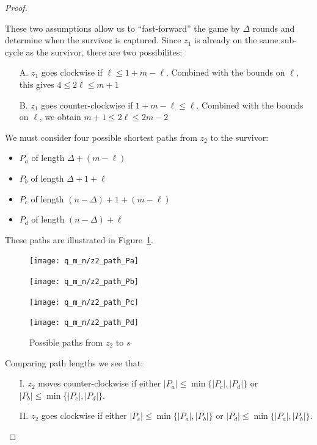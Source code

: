 \begin{proof}
\begin{proofpart}
  These two assumptions allow us to ``fast-forward'' the game by $\Delta$ rounds
  and determine when the survivor is captured. Since $z_1$ is already on the same sub-cycle as the survivor, there are two possibilites:

  \begin{itemize}
   \item[A.] $z_1$ goes clockwise if $\ell \leq 1 + m - \ell$.
         Combined with the bounds on $\ell$, this gives $4 \leq 2 \ell \leq m + 1$

   \item[B.] $z_1$ goes counter-clockwise if $1 + m - \ell \leq \ell$.
         Combined with the bounds on $\ell$, we obtain $m + 1 \leq 2 \ell \leq 2m - 2$
  \end{itemize}

  We must consider four possible shortest paths from $z_2$ to the survivor:

  \begin{itemize}
   \item $P_a$ of length $\Delta + (m - \ell)$
   \item $P_b$ of length $\Delta + 1 + \ell$
   \item $P_c$ of length $(n-\Delta) + 1 + (m-\ell)$
   \item $P_d$ of length $(n-\Delta) + \ell$
  \end{itemize}

  These paths are illustrated in Figure~\ref{fig:different_paths}.

  \begin{figure}
    \centering
    \texttt{[image: q\_m\_n/z2\_path\_Pa]}

    \texttt{[image: q\_m\_n/z2\_path\_Pb]}

    \texttt{[image: q\_m\_n/z2\_path\_Pc]}

    \texttt{[image: q\_m\_n/z2\_path\_Pd]}

    \caption{Possible paths from $z_2$ to $s$ \label{fig:different_paths}}
  \end{figure}

  Comparing path lengths we see that:

  \begin{itemize}
   \item[I.] $z_2$ moves counter-clockwise if either $|P_a| \leq \min \{ |P_c|, |P_d| \}$ or $|P_b| \leq \min \{ |P_c|, |P_d| \}$.

   \item[II.] $z_2$ goes clockwise if either $|P_c| \leq \min \{ |P_a|, |P_b| \}$ or $|P_d| \leq \min \{ |P_a|, |P_b| \}$.
  \end{itemize}


\end{proofpart}
\end{proof}

